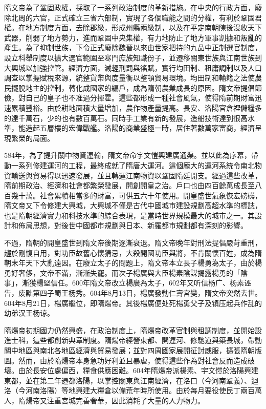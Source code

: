 隋文帝為了鞏固政權，採取了一系列政治制度的革新措施。在中央的行政方面，廢除北周的六官，正式確立三省六部制，實現了各個職能之間的分權，有利於鞏固君權。在地方制度方面，去除郡級，形成州縣兩級制，以及在平定南朝陳後沒收天下武器，削弱了地方勢力，進而鞏固中央集權，有力地防止了地方軍事割據和叛亂的產生。為了抑制世族，下令正式廢除魏晉以來由世家把持的九品中正制選官制度，設立科舉制度以擴大選官範圍至寒門庶族知識份子，並遷移關東世族與江南世族到大興城以加強控管。經濟方面，減輕刑罰與徭賦，實行均田制、租庸調制以及人口調查以掌握賦稅來源，統整貨幣與度量衡以整頓貿易環境。均田制和輸籍之法使農民擺脫地主的控制，轉化成國家的編戶，成為隋朝農業成長的原因。隋文帝提倡節儉，對自己的皇子也不准過分揮霍。這些都形成一種社會風氣，使得隋前期財富迅速累積豐裕。由於耕地面積大量增加，農作物產量提高。長安、洛陽官倉裡儲糧多的達千萬石，少的也有數百萬石。同時手工業有新的發展，造船技術達到很高水準，能造起五層樓的宏偉戰艦。洛陽的商業盛極一時，居住著數萬家富商，經濟呈現繁榮的局面。

584年，為了提升關中物資運輸，隋文帝命宇文愷興建廣通渠。並以此為序幕，帶動一系列修建運河的工程，最終成就了隋唐大運河。這個龐大的運河系統令南北物資輸送與貿易得以迅速發展，並且轉運江南物資以鞏固隋廷開支。經過這些改革，隋前期政治、經濟和社會都繁榮發展，開創開皇之治。戶口也由四百餘萬成長至八百幾十萬。社會累積相當多的財富，可供五六十年使用。開皇盛世氣象恢宏磅礴，隋文帝又下令修建大興城，大興城不僅是古代中國城市建設規劃高超水準的標誌，也是隋朝經濟實力和科技水準的綜合表現，是當時世界規模最大的城市之一。其設計和佈局思想，對後世中國都市規劃與日本、新羅都市規劃都有深刻的影響。

不過，隋朝的開皇盛世到隋文帝後期逐漸衰退。隋文帝晚年對刑法提倡嚴苛重刑，趨於剛愎自用，對功臣故舊心懷猜忌，大殺開國功臣與將，不肯關懷百姓，成為隋朝末年天下大亂遠因。在廢立太子的問題上，隋文帝本立長子楊勇為太子，由於楊勇好奢侈，文帝不滿，漸漸失寵。而次子楊廣與大臣楊素陰謀揭露楊勇的「陰事」，漸獲楊堅信任。600年隋文帝改立楊廣為太子，602年又听信杨广、杨素诬告，废黜第四子蜀王杨秀。604年8月13日，楊廣發動仁壽宮變，隋文帝突然去世。604年8月21日，楊廣繼位，即隋煬帝。其後楊廣便处死楊勇父子及镇压起兵作乱的幼弟汉王杨谅。

隋煬帝初期國力仍然興盛，在政治制度上，隋煬帝改革官制與租調制度，並開始設進士科，這些都創新典章制度。隋煬帝經營東都、開運河、修馳道與築長城，帶動關中地區與南北各地區經濟與貿易發展；並對四周國家展開征討威服，擴張隋朝版圖。然而，由於隋煬帝本身急功好利並且暴虐，使得這些作為對社會反而造成破壞。由於長安位處偏西，糧食供應困難。604年隋煬帝派楊素、宇文愷於洛陽興建東都，並在第二年遷都洛陽，以掌控關東與江南經濟，在洛口（今河南鞏義）、迴洛（今河南洛陽）等地興建大糧倉以備荒年時所使用。由於每月要役使民丁兩百萬人，隋煬帝又注重宮城完善奢華，因此消耗了大量的人力物力。


